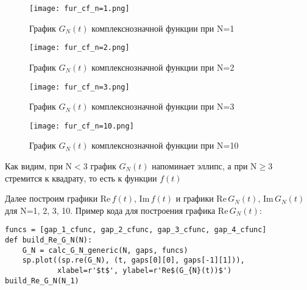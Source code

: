\documentclass[a4paper, 16pt]{article}
\begin{document}
\newpage
\vspace*{10mm}
\begin{figure}[!htb]
    \centering
    \texttt{[image: fur\_cf\_n=1.png]}
    \captionsetup{skip=0pt}
    \caption{График $G_N(t)$ комплекснозначной функции при N=1}
    \label{Рис:36}
\end{figure}
\begin{figure}[!htb]
    \centering
    \texttt{[image: fur\_cf\_n=2.png]}
    \captionsetup{skip=0pt}
    \caption{График $G_N(t)$ комплекснозначной функции при N=2}
    \label{Рис:37}
\end{figure}
\newpage
\begin{figure}[!htb]
    \centering
    \texttt{[image: fur\_cf\_n=3.png]}
    \captionsetup{skip=0pt}
    \caption{График $G_N(t)$ комплекснозначной функции при N=3}
    \label{Рис:38}
\end{figure}
\begin{figure}[!htb]
    \centering
    \texttt{[image: fur\_cf\_n=10.png]}
    \captionsetup{skip=0pt}
    \caption{График $G_N(t)$ комплекснозначной функции при N=10}
    \label{Рис:39}
\end{figure}


\noindent Как видим, при N$<$3 график $G_N(t)$ напоминает эллипс, а
при N$\geq3$ стремится к квадрату, то есть к функции $f(t)$


\noindent Далее построим графики Re$\,f(t)$, Im$\,f(t)$ и графики Re$\,G_N(t)$, Im$\,G_N(t)$ для N=1, 2, 3, 10.
Пример кода для построения графика Re$\,G_N(t)$:
\begin{lstlisting}
funcs = [gap_1_cfunc, gap_2_cfunc, gap_3_cfunc, gap_4_cfunc]
def build_Re_G_N(N):
    G_N = calc_G_N_generic(N, gaps, funcs)
    sp.plot((sp.re(G_N), (t, gaps[0][0], gaps[-1][1])),
            xlabel=r'$t$', ylabel=r'Re$(G_{N}(t))$')
build_Re_G_N(N_1)
\end{lstlisting}
\end{document}
